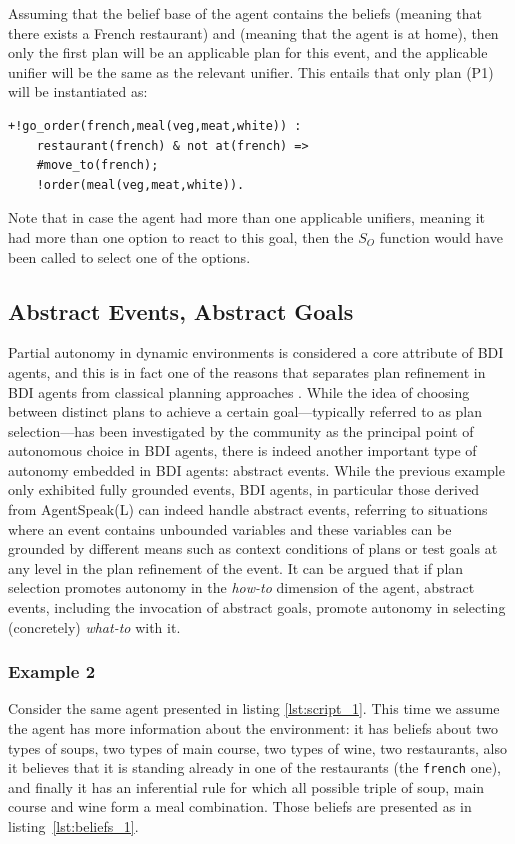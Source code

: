 Assuming that the belief base of the agent contains the beliefs  (meaning that there exists a French restaurant) and  (meaning that the agent is at home), then only the first plan will be an applicable plan for this event, and the applicable unifier will be the same as the relevant unifier. This entails that only plan (P1) will be instantiated as: 
\begin{verbatim}
+!go_order(french,meal(veg,meat,white)) :
    restaurant(french) & not at(french) =>
    #move_to(french);
    !order(meal(veg,meat,white)).
\end{verbatim}

Note that in case the agent had more than one applicable unifiers, meaning it had more than one option to react to this goal, then the $S_O$ function would have been called to select one of the options. 


\subsection{Abstract Events, Abstract Goals}
Partial autonomy in dynamic environments is considered a core attribute of BDI agents, and this is in fact one of the reasons that separates plan refinement in BDI agents from classical planning approaches \cite{DeSilva2004}. While the idea of choosing between distinct plans to achieve a certain goal---typically referred to as plan selection---has been investigated by the community as the principal point of autonomous choice in BDI agents, there is indeed another important type of autonomy embedded in BDI agents: abstract events. While the previous example only exhibited fully grounded events, BDI agents, in particular those derived from  AgentSpeak(L)  \cite{Rao1995,RaoAS1996} 
can indeed handle abstract events, referring to situations where an event contains unbounded variables and these variables can be grounded by different means such as context conditions of plans or test goals at any level in the plan refinement of the event. It can be argued that if plan selection promotes autonomy in the \textit{how-to} dimension of the agent, abstract events, including the invocation of abstract goals, promote autonomy in selecting (concretely) \textit{what-to} with it.

\subsubsection*{Example 2}
Consider the same agent presented in listing \ref{lst:script_1}. This time we assume the agent has more information about the environment: it has beliefs about two types of soups, two types of main course, two types of wine, two restaurants, also it believes that it is standing already in one of the restaurants (the \texttt{french} one), and finally it has an inferential rule for which all possible triple of soup, main course and wine form  a meal combination. Those beliefs are presented as in listing~\ref{lst:beliefs_1}.

